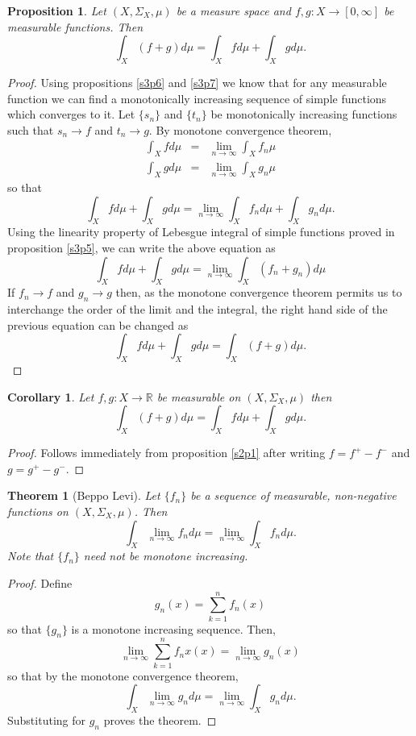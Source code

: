 \documentclass{article}
\newcommand{\sor}{\mathbb{R}}
\theoremstyle{plain}
\newtheorem{thm}{Theorem}
\numberwithin{thm}{section}
\theoremstyle{plain}
\newtheorem{prop}{Proposition}
\numberwithin{prop}{section}
\theoremstyle{definition}
\numberwithin{defn}{section}
\theoremstyle{remark}
\theoremstyle{plain}
\newtheorem{cor}{Corollary}
\numberwithin{cor}{section}
\numberwithin{equation}{section}
\begin{document}
\begin{prop}\label{s4p2}
Let $(X, \Sigma_X, \mu)$ be a measure space and $f, g: X \rightarrow [0, \infty]$
be measurable functions. Then
\[
\int_X(f + g)d\mu = \int_X f d\mu + \int_X g d\mu.
\]
\end{prop}
\begin{proof}
Using propositions \ref{s3p6} and \ref{s3p7} we know that for any measurable
function we can find a monotonically increasing sequence of simple functions
which converges to it. Let $\{s_n\}$ and $\{t_n\}$ be monotonically increasing
functions such that $s_n \rightarrow f$ and $t_n \rightarrow g$. By monotone
convergence theorem,
\begin{eqnarray*}
\int_X f d\mu &=& \lim_{n \rightarrow \infty} \int_X f_n \mu \\
\int_X g d\mu &=& \lim_{n \rightarrow \infty} \int_X g_n \mu
\end{eqnarray*}
so that
\[
\int_X fd\mu + \int_X gd\mu = \lim_{n \rightarrow \infty} \int_X f_n d\mu +
\int_X g_n d\mu.
\]
Using the linearity property of Lebesgue integral of simple functions proved in
proposition \ref{s3p5}, we can write the above equation as
\[
\int_X fd\mu + \int_X gd\mu = \lim_{n \rightarrow \infty} \int_X (f_n + g_n) d\mu
\]
If $f_n \rightarrow f$ and $g_n \rightarrow g$ then, as the monotone convergence
theorem permits us to interchange the order of the limit and the integral, the
right hand side of the previous equation can be changed as
\[
\int_X fd\mu + \int_X gd\mu = \int_X (f + g)d\mu.
\]
\end{proof}

\begin{cor}\label{s4c1}
Let $f, g: X \rightarrow \sor$ be measurable on $(X, \Sigma_X, \mu)$ then
\[
\int_X(f + g)d\mu = \int_X f d\mu + \int_X g d\mu.
\]
\end{cor}
\begin{proof}
Follows immediately from proposition \ref{s2p1} after writing $f = f^+ - f^-$
and $g = g^+ - g^-$.
\end{proof}

\begin{thm}[Beppo Levi]\label{s4t3}
Let $\{f_n\}$ be a sequence of measurable, non-negative functions on $(X, 
\Sigma_X, \mu)$. Then
\[
\int_X \lim_{n \rightarrow \infty}f_n d\mu = 
\lim_{n \rightarrow \infty}\int_X f_n d\mu.
\]
Note that $\{f_n\}$ need not be monotone increasing.
\end{thm}
\begin{proof}
Define 
\[
g_n(x) = \sum_{k=1}^n f_n(x)
\]
so that $\{g_n\}$ is a monotone increasing sequence. Then,
\[
\lim_{n \rightarrow \infty}\sum_{k=1}^n f_nx(x) = \lim_{n \rightarrow \infty}g_n(x)
\]
so that by the monotone convergence theorem,
\[
\int_X \lim_{n \rightarrow \infty} g_n d\mu = \lim_{n \rightarrow \infty}\int_X
g_n d\mu.
\]
Substituting for $g_n$ proves the theorem.
\end{proof}
\end{document}
